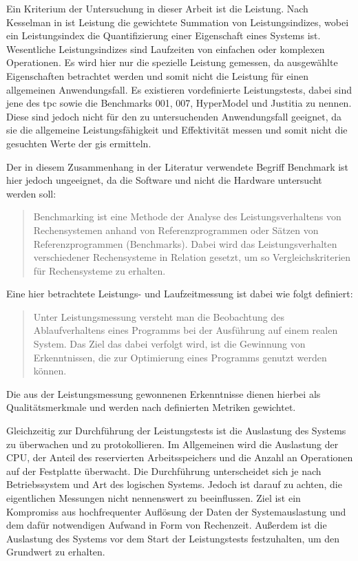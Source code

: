 \label{Leistungstests}
Ein Kriterium der Untersuchung in dieser Arbeit ist die Leistung.
Nach Kesselman in \cite[S.20]{book:Leistungsanalyse} ist Leistung die gewichtete Summation von Leistungsindizes, wobei ein Leistungsindex die Quantifizierung einer Eigenschaft eines Systems ist.
Wesentliche Leistungsindizes sind Laufzeiten von einfachen oder komplexen Operationen.
Es wird hier nur die spezielle Leistung gemessen, da ausgewählte Eigenschaften betrachtet werden und somit nicht die Leistung für einen allgemeinen Anwendungsfall.
Es existieren vordefinierte Leistungstests, dabei sind jene des \Gls{tpc} sowie die Benchmarks 001, 007, HyperModel und Justitia zu nennen.
Diese sind jedoch nicht für den zu untersuchenden Anwendungsfall geeignet, da sie die allgemeine Leistungsfähigkeit und Effektivität messen und somit nicht die gesuchten Werte der \Gls{gis} ermitteln.

Der in diesem Zusammenhang in der Literatur verwendete Begriff Benchmark ist hier jedoch ungeeignet, da die Software und nicht die Hardware untersucht werden soll:
\begin {quote}
Benchmarking ist eine Methode der Analyse des Leistungsverhaltens von Rechensystemen anhand von Referenzprogrammen oder Sätzen von Referenzprogrammen (Benchmarks). Dabei wird das Leistungsverhalten verschiedener Rechensysteme in Relation gesetzt, um so Vergleichskriterien  für Rechensysteme zu erhalten. \cite[S.24]{book:Leistungsanalyse}
\end{quote}
Eine hier betrachtete Leistungs- und Laufzeitmessung ist dabei wie folgt definiert:
\begin {quote}
Unter Leistungsmessung versteht man die Beobachtung des Ablaufverhaltens eines Programms bei der Ausführung auf einem realen System. Das Ziel das dabei verfolgt wird, ist die Gewinnung von Erkenntnissen, die zur Optimierung eines Programms genutzt werden können. \cite[S.28]{book:Leistungsanalyse}
\end{quote}
Die aus der Leistungsmessung gewonnenen Erkenntnisse dienen hierbei als Qualitätsmerkmale und werden nach definierten Metriken gewichtet.

Gleichzeitig zur Durchführung der Leistungstests ist die Auslastung des Systems zu überwachen und zu protokollieren.
Im Allgemeinen wird die Auslastung der CPU, der Anteil des reservierten Arbeitsspeichers und die Anzahl an Operationen auf der Festplatte überwacht.
Die Durchführung unterscheidet sich je nach Betriebssystem und Art des logischen Systems.
Jedoch ist darauf zu achten, die eigentlichen Messungen nicht nennenswert zu beeinflussen.
Ziel ist ein Kompromiss aus hochfrequenter Auflösung der Daten der Systemauslastung und dem dafür notwendigen Aufwand in Form von Rechenzeit.
Außerdem ist die Auslastung des Systems vor dem Start der Leistungstests festzuhalten, um den Grundwert zu erhalten.